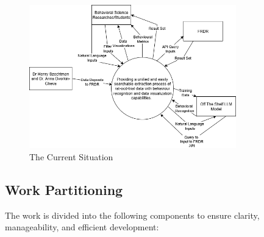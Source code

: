 \documentclass[12pt]{article}
\begin{document}
\begin{figure}[H]
    \centering
    \includegraphics[width=0.8\textwidth]{6.2 Context of the Work.png}
    \caption{The Current Situation}
    \label{fig:myimage}
\end{figure}

\subsection{Work Partitioning}

The work is divided into the following components to ensure clarity, manageability, and efficient development:
\end{document}
